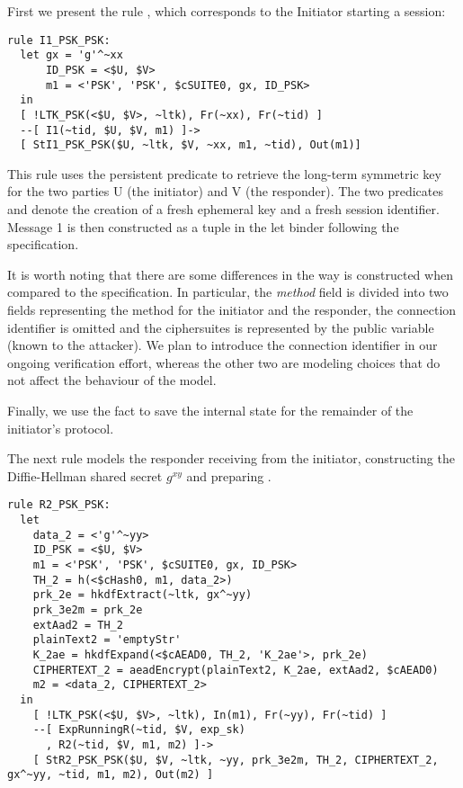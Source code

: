 First we present the rule , which corresponds to the
Initiator starting a session:
\begin{lstlisting}
rule I1_PSK_PSK:
  let gx = 'g'^~xx
      ID_PSK = <$U, $V>
      m1 = <'PSK', 'PSK', $cSUITE0, gx, ID_PSK> 
  in
  [ !LTK_PSK(<$U, $V>, ~ltk), Fr(~xx), Fr(~tid) ]
  --[ I1(~tid, $U, $V, m1) ]->
  [ StI1_PSK_PSK($U, ~ltk, $V, ~xx, m1, ~tid), Out(m1)]
\end{lstlisting}

This rule uses the persistent predicate  to retrieve the long-term
symmetric key for the two parties U (the initiator) and V (the responder).  The
two predicates  and  denote the creation of a fresh
ephemeral key and a fresh session identifier.  Message 1 is then constructed as
a tuple in the let binder following the specification.

It is worth noting that there are some differences in the way  is
constructed when compared to the specification. In particular, the \emph{method}
field is divided into two fields representing the method for the initiator and
the responder, the connection identifier is omitted and the ciphersuites is
represented by the public variable
 (known to the attacker). We plan to introduce the connection
identifier \mCi in our ongoing verification effort, whereas the other two are
modeling choices that do not affect the behaviour of the model.

Finally, we use the fact  %
to save the internal state for the remainder of the initiator's protocol.

The next rule models the responder receiving  from the initiator,
constructing the Diffie-Hellman shared secret $g^{xy}$ and preparing .
\begin{lstlisting}
rule R2_PSK_PSK:
  let
    data_2 = <'g'^~yy>
    ID_PSK = <$U, $V>
    m1 = <'PSK', 'PSK', $cSUITE0, gx, ID_PSK>
    TH_2 = h(<$cHash0, m1, data_2>)
    prk_2e = hkdfExtract(~ltk, gx^~yy)
    prk_3e2m = prk_2e
    extAad2 = TH_2
    plainText2 = 'emptyStr'
    K_2ae = hkdfExpand(<$cAEAD0, TH_2, 'K_2ae'>, prk_2e)
    CIPHERTEXT_2 = aeadEncrypt(plainText2, K_2ae, extAad2, $cAEAD0)
    m2 = <data_2, CIPHERTEXT_2>
  in
    [ !LTK_PSK(<$U, $V>, ~ltk), In(m1), Fr(~yy), Fr(~tid) ]
    --[ ExpRunningR(~tid, $V, exp_sk)
      , R2(~tid, $V, m1, m2) ]->
    [ StR2_PSK_PSK($U, $V, ~ltk, ~yy, prk_3e2m, TH_2, CIPHERTEXT_2, gx^~yy, ~tid, m1, m2), Out(m2) ]
\end{lstlisting}

